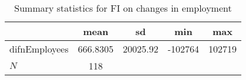 \begin{table}[htbp]\centering
\def\sym#1{\ifmmode^{#1}\else\(^{#1}\)\fi}
\caption{Summary statistics for FI on changes in employment}
\begin{tabular}{l*{1}{cccc}}
\hline\hline
            &        mean&          sd&         min&         max\\
\hline
difnEmployees&    666.8305&    20025.92&     -102764&      102719\\
\hline
\(N\)       &         118&            &            &            \\
\hline\hline
\end{tabular}
\end{table}
